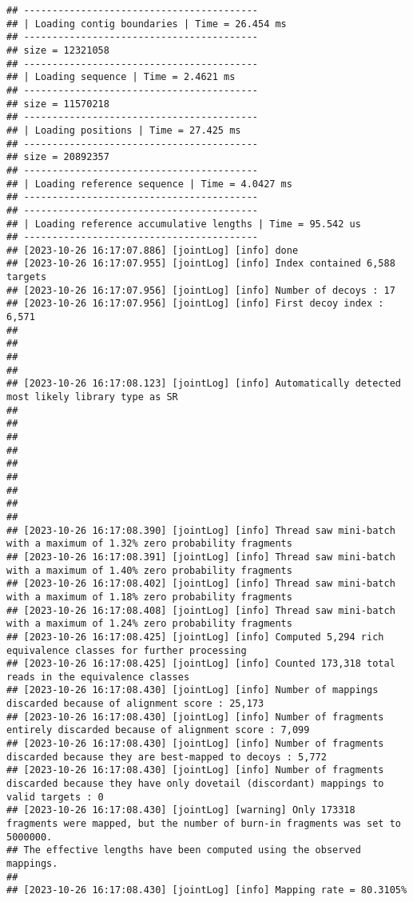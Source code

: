 \documentclass[
]{book}
\begin{document}
\begin{verbatim}
## -----------------------------------------
## | Loading contig boundaries | Time = 26.454 ms
## -----------------------------------------
## size = 12321058
## -----------------------------------------
## | Loading sequence | Time = 2.4621 ms
## -----------------------------------------
## size = 11570218
## -----------------------------------------
## | Loading positions | Time = 27.425 ms
## -----------------------------------------
## size = 20892357
## -----------------------------------------
## | Loading reference sequence | Time = 4.0427 ms
## -----------------------------------------
## -----------------------------------------
## | Loading reference accumulative lengths | Time = 95.542 us
## -----------------------------------------
## [2023-10-26 16:17:07.886] [jointLog] [info] done
## [2023-10-26 16:17:07.955] [jointLog] [info] Index contained 6,588 targets
## [2023-10-26 16:17:07.956] [jointLog] [info] Number of decoys : 17
## [2023-10-26 16:17:07.956] [jointLog] [info] First decoy index : 6,571 
## 
## 
## 
## 
## [2023-10-26 16:17:08.123] [jointLog] [info] Automatically detected most likely library type as SR
## 
## 
## 
## 
## 
## 
## 
## 
## 
## [2023-10-26 16:17:08.390] [jointLog] [info] Thread saw mini-batch with a maximum of 1.32% zero probability fragments
## [2023-10-26 16:17:08.391] [jointLog] [info] Thread saw mini-batch with a maximum of 1.40% zero probability fragments
## [2023-10-26 16:17:08.402] [jointLog] [info] Thread saw mini-batch with a maximum of 1.18% zero probability fragments
## [2023-10-26 16:17:08.408] [jointLog] [info] Thread saw mini-batch with a maximum of 1.24% zero probability fragments
## [2023-10-26 16:17:08.425] [jointLog] [info] Computed 5,294 rich equivalence classes for further processing
## [2023-10-26 16:17:08.425] [jointLog] [info] Counted 173,318 total reads in the equivalence classes 
## [2023-10-26 16:17:08.430] [jointLog] [info] Number of mappings discarded because of alignment score : 25,173
## [2023-10-26 16:17:08.430] [jointLog] [info] Number of fragments entirely discarded because of alignment score : 7,099
## [2023-10-26 16:17:08.430] [jointLog] [info] Number of fragments discarded because they are best-mapped to decoys : 5,772
## [2023-10-26 16:17:08.430] [jointLog] [info] Number of fragments discarded because they have only dovetail (discordant) mappings to valid targets : 0
## [2023-10-26 16:17:08.430] [jointLog] [warning] Only 173318 fragments were mapped, but the number of burn-in fragments was set to 5000000.
## The effective lengths have been computed using the observed mappings.
## 
## [2023-10-26 16:17:08.430] [jointLog] [info] Mapping rate = 80.3105%

\end{verbatim}
\end{document}
